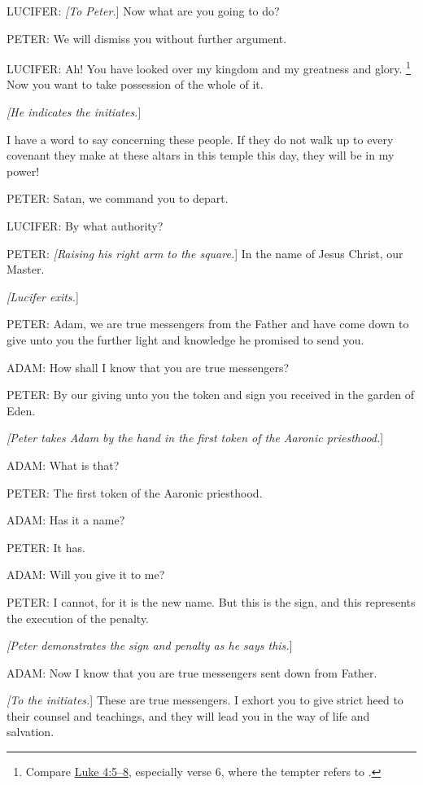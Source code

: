			LUCIFER: \textit{[To Peter.}] Now what are you going to do?

			PETER: We will dismiss you without further argument.

			LUCIFER: Ah! You have looked over my kingdom and my greatness and glory.%
				\footnote{%
					Compare \hyperref[LUKE-4-5]{Luke 4:5--8}, especially verse 6, where the tempter refers to .
					} 
			Now you want to take possession of the whole of it.

			\textit{[He indicates the initiates.}]

			I have a word to say concerning these people. If they do not walk up to every covenant they make at these altars in this temple this day, they will be in my power!

			PETER: Satan, we command you to depart.

			LUCIFER: By what authority?

			PETER: \textit{[Raising his right arm to the square.}] In the name of Jesus Christ, our Master.

			\textit{[Lucifer exits.}]
			
			PETER: Adam, we are true messengers from the Father and have come down to give unto you the further light and knowledge he promised to send you.

			ADAM: How shall I know that you are true messengers?

			PETER: By our giving unto you the token and sign you received in the garden of Eden.

			\textit{[Peter takes Adam by the hand in the first token of the Aaronic priesthood.}]

			ADAM: What is that?

			PETER: The first token of the Aaronic priesthood.

			ADAM: Has it a name?

			PETER: It has.

			ADAM: Will you give it to me?

			PETER: I cannot, for it is the new name. But this is the sign, and this represents the execution of the penalty.

			\textit{[Peter demonstrates the sign and penalty as he says this.}]

			ADAM: Now I know that you are true messengers sent down from Father.

			\textit{[To the initiates.}] These are true messengers. I exhort you to give strict heed to their counsel and teachings, and they will lead you in the way of life and salvation.
			
